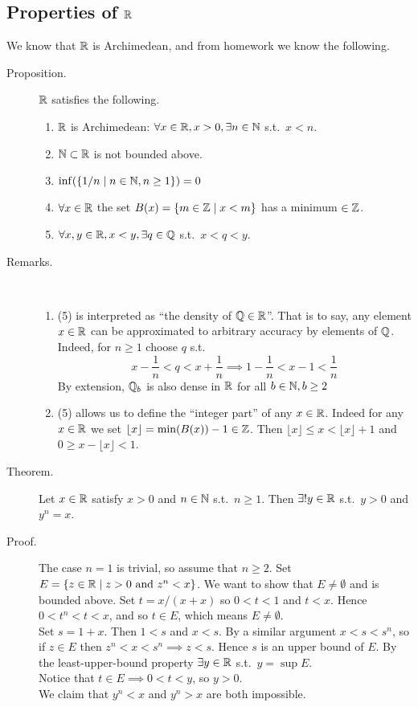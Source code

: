 \documentclass[letterpaper,11pt]{article}
\begin{document}
\subsection{Properties of $\mathbb{R}$}
We know that $\mathbb{R}$ is Archimedean, and from homework we know the following.

\begin{description}
\item[Proposition.] $\mathbb{R}$ satisfies the following.
  \begin{enumerate}[(1)]
  \item $\mathbb{R}$ is Archimedean: $\forall x\in\mathbb{R}, x>0,\exists n\in\mathbb{N}$ s.t.\ $x<n$.
  \item $\mathbb{N}\subset\mathbb{R}$ is not bounded above.
  \item $\inf(\{1/n\;|\;n\in\mathbb{N},n\ge1\})=0$
  \item $\forall x\in\mathbb{R}$ the set $B(x)=\{m\in\mathbb{Z}\;|\;x<m\}$ has a minimum $\in\mathbb{Z}$.
  \item $\forall x,y\in\mathbb{R}, x<y, \exists q\in\mathbb{Q}$ s.t.\ $x<q<y$.
  \end{enumerate}

\item[Remarks.]\text{}\vspace{-0.2in}\\
  \begin{enumerate}[1)]
  \item (5) is interpreted as ``the density of $\mathbb{Q}\in\mathbb{R}$''. That is to say,
      any element $x\in\mathbb{R}$ can be approximated to arbitrary accuracy by elements
      of $\mathbb{Q}$. Indeed, for $n\ge 1 $ choose $q$ s.t.\
      \[
      x-\frac{1}{n}<q<x+\frac{1}{n}\implies 1-\frac{1}{n}<x-1<\frac{1}{n}
      \]
      By extension, $\mathbb{Q}_b$ is also dense in $\mathbb{R}$ for all $b\in\mathbb{N}, b\ge2$
  \item (5) allows us to define the ``integer part'' of any $x\in\mathbb{R}$. Indeed
      for any $x\in\mathbb{R}$ we set $\lfloor x\rfloor = \min(B(x))-1\in\mathbb{Z}$. Then
      $\lfloor x\rfloor\le x < \lfloor x\rfloor +1$ and $0\ge x-\lfloor x\rfloor<1$.
  \end{enumerate}


\item[Theorem.] Let $x\in\mathbb{R}$ satisfy $x>0$ and $n\in\mathbb{N}$ s.t.\ $n\ge1$.
    Then $\exists! y\in\mathbb{R}$ s.t.\ $y>0$ and $y^n=x$.

\item[Proof.] The case $n=1$ is trivial, so assume that $n\ge 2$.
    Set $E=\{z\in\mathbb{R}\;|\;z>0\text{ and }z^n<x\}$. We want to show that
    $E\ne\emptyset$ and is bounded above. Set $t=x/(x+x)$ so $0<t<1$
    and $t<x$. Hence $0<t^n<t<x$, and so $t\in E$, which means $E\ne\emptyset$.\\
    Set $s=1+x$. Then $1<s$ and $x<s$. By a similar argument $x<s<s^n$,
    so if $z\in E$ then $z^n<x<s^n\implies z<s$. Hence $s$ is an upper bound of $E$.
    By the least-upper-bound property $\exists y\in\mathbb{R}$ s.t.\ $y=\sup E$.\\
    Notice that $t\in E\implies 0<t<y$, so $y>0$.\\
    We claim that $y^n<x$ and $y^n>x$ are both impossible.\\


\end{description}
\end{document}
